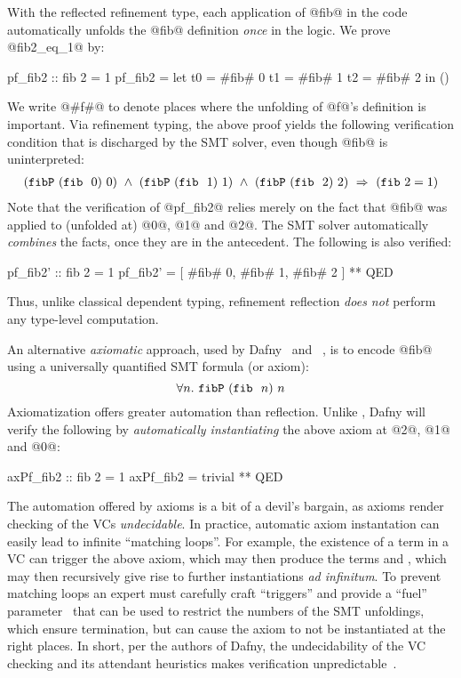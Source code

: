 %
With the reflected refinement type,
each application of @fib@ in the code
automatically unfolds the @fib@ definition
\textit{once} in the logic.
%
We prove @fib2_eq_1@ by:
%
\begin{code}
  pf_fib2 :: { fib 2 = 1 }
  pf_fib2 = let t0 = #fib# 0 
                t1 = #fib# 1
                t2 = #fib# 2 
            in  ()
\end{code}
%
We write @#f#@ to denote places where the
unfolding of @f@'s definition is important.
%
Via refinement typing, the above proof yields the
following verification condition that is
discharged by the SMT solver, even though @fib@
is uninterpreted:
%
\begin{align*}
   (\fibdef\ (\fib\ 0)\ 0) \ \wedge\ (\fibdef\ (\fib\ 1)\ 1) \ \wedge\ 
   (\fibdef\ (\fib\ 2)\ 2) \  \Rightarrow\ (\fib{2} = 1)
\end{align*}
%
Note that the verification of @pf_fib2@ relies
merely on the fact that @fib@ was applied
to (\ie unfolded at) @0@, @1@ and @2@.
%
The SMT solver automatically \emph{combines}
the facts, once they are in the antecedent.
The following is also verified:
%
\begin{code}
  pf_fib2' :: { fib 2 = 1 }
  pf_fib2' = [ #fib# 0, #fib# 1, #fib# 2 ] ** QED
\end{code}
%
%
Thus, unlike classical dependent typing, refinement
reflection \emph{does not} perform any type-level
computation.

%
An alternative \emph{axiomatic} approach,
used by Dafny~\citep{dafny} and
\fstar~\citep{fstar},
is to encode @fib@ using a universally
quantified SMT formula (or axiom):
$$\forall n.\ \texttt{fibP}\ (\texttt{fib}\ {\ }n)\ n$$
%
Axiomatization offers greater automation than
reflection. Unlike \toolname, Dafny
will verify the following by
\emph{automatically instantiating} the above
axiom at @2@, @1@ and @0@:
%
\begin{code}
  axPf_fib2 :: { fib 2 = 1 }
  axPf_fib2 = trivial ** QED
\end{code}

The automation offered by axioms is a bit of a
devil's bargain, as axioms render checking of
the VCs \emph{undecidable}.
%
In practice, automatic axiom instantation can
easily lead to infinite ``matching loops''.
%
For example, the existence of a term  in a VC
can trigger the above axiom, which may then produce
the terms  and , which may then
recursively give rise to further instantiations
\emph{ad infinitum}.
%
To prevent matching loops an expert must carefully
craft ``triggers'' and provide a ``fuel''
parameter~\citep{Amin2014ComputingWA} that can be
used to restrict the numbers of the SMT unfoldings,
which ensure termination, but can cause the axiom
to not be instantiated at the right places.
%
In short, per the authors of Dafny, the
undecidability of the VC checking and its
attendant heuristics makes verification
unpredictable~\citep{Leino16}.

